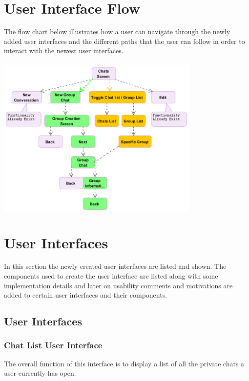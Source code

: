 \documentclass[11pt]{article}
\begin{document}


\setcounter{tocdepth}{3}
\setcounter{secnumdepth}{5}
\tableofcontents

\newpage
\section{User Interface Flow}
The flow chart below illustrates how a user can navigate through the newly added user interfaces and the different paths that the user can follow in order to interact with the newest user interfaces. \\\\
\includegraphics[width=380px]{images/flow.png}

\newpage
\section{User Interfaces}
In this section the newly created user interfaces are listed and shown. The components used to create the user interface are listed along with some implementation details and later on usability comments and motivations are added to certain user interfaces and their components.

\subsection{User Interfaces}

\subsubsection{Chat List User Interface}
The overall function of this interface is to display a list of all the private chats a user currently has open.\\
\end{document}
